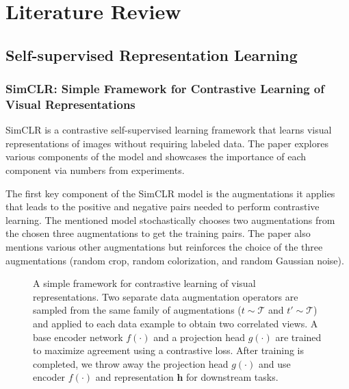 \section{Literature Review}
\label{sec:related_work}

\subsection{Self-supervised Representation Learning}
\subsubsection{SimCLR: Simple Framework for Contrastive Learning of Visual Representations}
SimCLR\cite{chen2020simple} is a contrastive self-supervised learning framework that learns visual representations of images without requiring labeled data. The paper explores various components of the model and showcases the importance of each component via numbers from experiments.

The first key component of the SimCLR model is the augmentations it applies that leads to the positive and negative pairs needed to perform contrastive learning. The mentioned model stochastically chooses two augmentations from the chosen three augmentations to get the training pairs. The paper also mentions various other augmentations but reinforces the choice of the three augmentations (random crop, random colorization, and random Gaussian noise).

\begin{figure}[h]
\small
    \centering
{}
    \caption{A simple framework for contrastive learning of visual representations. 
    Two separate data augmentation operators are sampled from the same family of augmentations ($t\sim \mathcal{T}$ and $t'\sim \mathcal{T}$) and applied to each data example to obtain two correlated views.
    A base encoder network $f(\cdot)$ and a projection head $g(\cdot)$ are trained to maximize agreement using a contrastive loss. After training is completed, we throw away the projection head $g(\cdot)$ and use encoder $f(\cdot)$ and representation $\bm h$ for downstream tasks.}
    \label{fig:framework}
\end{figure}

